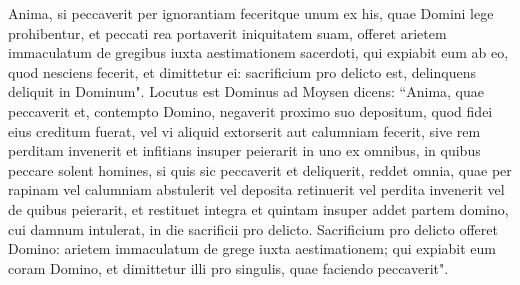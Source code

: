 \begin{biblechapter}
\verse Anima, si peccaverit per ignorantiam feceritque unum ex his, quae Domini lege prohibentur, et peccati rea portaverit iniquitatem suam, 
\verse offeret arietem immaculatum de gregibus iuxta aestimationem sacerdoti, qui expiabit eum ab eo, quod nesciens fecerit, et dimittetur ei: 
\verse sacrificium pro delicto est, delinquens deliquit in Dominum". 
\verse Locutus est Dominus ad Moysen dicens: 
\verse “Anima, quae peccaverit et, contempto Domino, negaverit proximo suo depositum, quod fidei eius creditum fuerat, vel vi aliquid extorserit aut calumniam fecerit, 
\verse sive rem perditam invenerit et infitians insuper peierarit in uno ex omnibus, in quibus peccare solent homines, 
\verse si quis sic peccaverit et deliquerit, reddet omnia, quae per rapinam vel calumniam abstulerit vel deposita retinuerit vel perdita invenerit 
\verse vel de quibus peierarit, et restituet integra et quintam insuper addet partem domino, cui damnum intulerat, in die sacrificii pro delicto. 
\verse Sacrificium pro delicto offeret Domino: arietem immaculatum de grege iuxta aestimationem; 
\verse qui expiabit eum coram Domino, et dimittetur illi pro singulis, quae faciendo peccaverit". 
\end{biblechapter}

